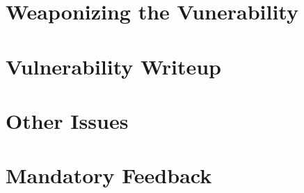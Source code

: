 \documentclass[12pt]{article}
\begin{document}
\maketitle

\section{Weaponizing the Vunerability}

\section{Vulnerability Writeup}

\section{Other Issues}

\section{Mandatory Feedback}
\end{document}
